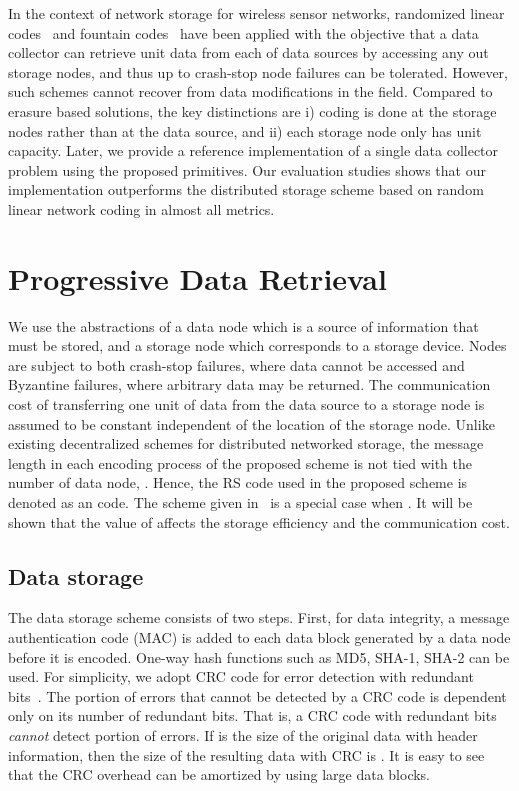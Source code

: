 \documentclass[10pt,journal,letterpaper,compsoc]{IEEEtran}
\newcommand{\0}{{\bf 0}}
\newcounter{step}
\begin{document}
In the context of network storage for wireless sensor networks,
randomized linear codes~\cite{DIM06} and fountain codes~\cite{lin2007dpl} have
been applied with the objective that a data collector can retrieve unit data
from each of  data sources by accessing any  out  storage nodes,
and thus up to  crash-stop node failures can be tolerated.  However, such schemes
cannot recover from data modifications in the field. Compared to erasure
based solutions, the key distinctions are i) coding is done at the storage
nodes rather than at the data source, and ii) each storage node only has unit
capacity. Later, we provide a reference implementation of a single data
collector problem using the proposed primitives. Our evaluation studies shows that
our implementation outperforms the distributed storage scheme based on random
linear network coding in almost all metrics. 
\section{Progressive Data Retrieval}
\label{sect:progressive}
We use the abstractions of a data node which is a source of information that
must be stored, and a storage node which corresponds to a storage device.
Nodes are subject to both crash-stop failures, where data cannot be accessed
and Byzantine failures, where arbitrary data may be returned.  The
communication cost of transferring one unit of data from the data source to a
storage node is assumed to be constant independent of the location of the
storage node.
Unlike existing decentralized schemes for distributed networked storage, the message length in each encoding process of the proposed scheme is not tied with the number of data  node, . Hence, the RS code used in the proposed scheme is denoted as an  code. The scheme given in~\cite{Han10-Infocom} is a special case when . It will be shown that the value of  affects the storage efficiency and the communication cost.
\subsection{Data storage}
\label{sect:data_storage}
The data storage scheme consists of two steps. First, for data integrity, a
message authentication code (MAC) is added to each data block generated by a data node
before it is encoded. One-way hash functions such as MD5, SHA-1, SHA-2 can
be used. For simplicity, we adopt  CRC code for error detection with 
redundant bits~\cite{MOO05,REE99}. The portion of
errors that cannot be detected by a CRC code is dependent only on its number of
redundant bits. That is, a CRC code with  redundant bits {\it cannot} detect
 portion of errors.  If  is the size of the original data with header information, then the size of the resulting data with CRC is . It is easy to see that the CRC overhead can be amortized by using large data blocks.  
\end{document}
